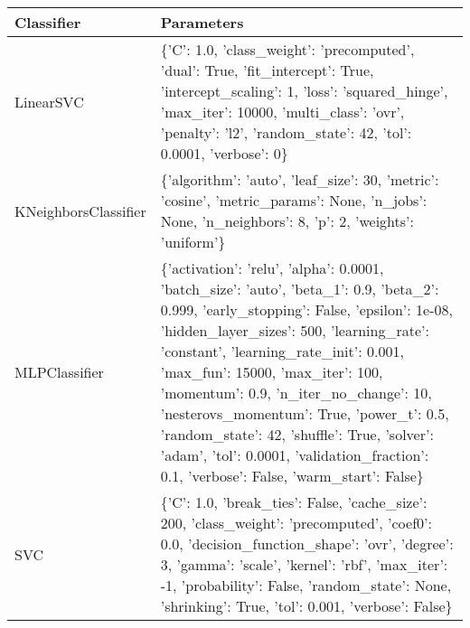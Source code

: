 \begin{tabular}{p{4.3cm}|p{9cm}}
\toprule
            Classifier &                                                                                                                                                                                                                                                                                                                                                                                                                                                                                     Parameters \\
\midrule
             LinearSVC &                                                                                                                                                                                                                                                     \{'C': 1.0, 'class\_weight': 'precomputed', 'dual': True, 'fit\_intercept': True, 'intercept\_scaling': 1, 'loss': 'squared\_hinge', 'max\_iter': 10000, 'multi\_class': 'ovr', 'penalty': 'l2', 'random\_state': 42, 'tol': 0.0001, 'verbose': 0\} \\
  KNeighborsClassifier &                                                                                                                                                                                                                                                                                                                                              \{'algorithm': 'auto', 'leaf\_size': 30, 'metric': 'cosine', 'metric\_params': None, 'n\_jobs': None, 'n\_neighbors': 8, 'p': 2, 'weights': 'uniform'\} \\
         MLPClassifier & \{'activation': 'relu', 'alpha': 0.0001, 'batch\_size': 'auto', 'beta\_1': 0.9, 'beta\_2': 0.999, 'early\_stopping': False, 'epsilon': 1e-08, 'hidden\_layer\_sizes': 500, 'learning\_rate': 'constant', 'learning\_rate\_init': 0.001, 'max\_fun': 15000, 'max\_iter': 100, 'momentum': 0.9, 'n\_iter\_no\_change': 10, 'nesterovs\_momentum': True, 'power\_t': 0.5, 'random\_state': 42, 'shuffle': True, 'solver': 'adam', 'tol': 0.0001, 'validation\_fraction': 0.1, 'verbose': False, 'warm\_start': False\} \\
                   SVC &                                                                                                                                                                                               \{'C': 1.0, 'break\_ties': False, 'cache\_size': 200, 'class\_weight': 'precomputed', 'coef0': 0.0, 'decision\_function\_shape': 'ovr', 'degree': 3, 'gamma': 'scale', 'kernel': 'rbf', 'max\_iter': -1, 'probability': False, 'random\_state': None, 'shrinking': True, 'tol': 0.001, 'verbose': False\} \\

\end{tabular}
